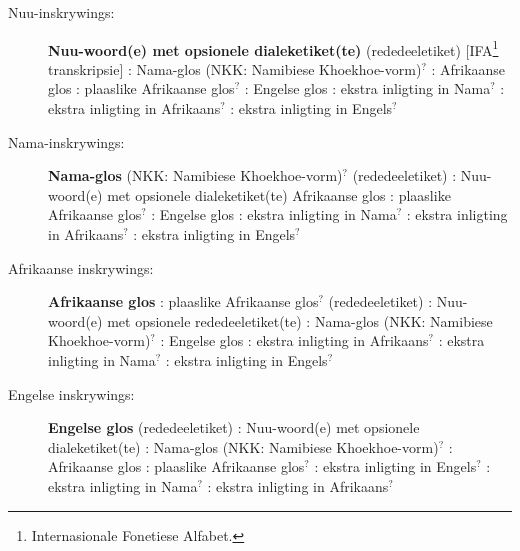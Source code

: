 \begin{description}
    \item [N\textipa{\textvertline}uu-inskrywings:]
        \textbf{N\textipa{\textvertline}uu-woord(e) met opsionele
        dialeketiket(te)}
        (rededeeletiket) [IFA\footnote{Internasionale Fonetiese Alfabet.}
        transkripsie] : Nama-glos (NKK: Namibiese
        Khoe\-khoe-vorm)$^?$ : Afrikaanse
        glos : plaaslike
        Afrikaanse glos$^?$ : Engelse glos
        : ekstra inligting in Nama$^?$
        : ekstra inligting in Afrikaans$^?$
        : ekstra inligting in Engels$^?$
    \item [Nama-inskrywings:] \textbf{Nama-glos} (NKK: Namibiese
        Khoekhoe-vorm)$^?$ (rededeeletiket)
        :
        N\textipa{\textvertline}uu-woord(e) met opsionele
        dialeketiket(te)  Afrikaanse
        glos : plaaslike
        Afrikaanse glos$^?$ : Engelse glos
        : ekstra inligting in Nama$^?$
        : ekstra inligting in Afrikaans$^?$
        : ekstra inligting in Engels$^?$
    \item [Afrikaanse inskrywings:] \textbf{Afrikaanse glos}
        : plaaslike
        Afrikaanse glos$^?$ (rededeeletiket)
        :
        N\textipa{\textvertline}uu-woord(e) met opsionele
        rededeeletiket(te) : Nama-glos 
        (NKK: Namibiese Khoekhoe-vorm)$^?$ : Engelse
        glos : ekstra inligting in
        Afrikaans$^?$ : ekstra inligting in
        Nama$^?$ : ekstra inligting in
        Engels$^?$
    \item [Engelse inskrywings:] \textbf{Engelse glos}
        (rededeeletiket) : N\textipa{\textvertline}uu-woord(e) met
        opsionele dialeketiket(te) : Nama-glos (NKK:
        Namibiese Khoe\-khoe-vorm)$^?$
        : Afrikaanse glos
        : plaaslike
        Afrikaanse glos$^?$ : ekstra
        inligting in Engels$^?$ : ekstra
        inligting in Nama$^?$ : ekstra
        inligting in Afrikaans$^?$
\end{description}


